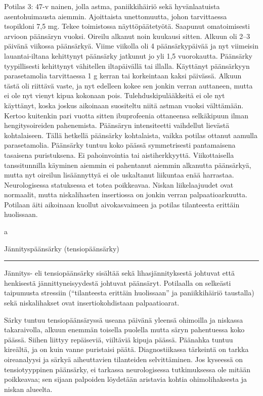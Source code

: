 \documentclass[
]{book}
\begin{document}
Potilas 3: 47-v nainen, jolla astma, paniikkihäiriö sekä hyvänlaatuista asentohuimausta aiemmin. Ajoittaista unettomuutta, johon tarvittaessa tsopikloni 7,5 mg. Tekee toimistossa näyttöpäätetyötä. Saapunut omatoimisesti arvioon päänsäryn vuoksi. Oireilu alkanut noin kuukausi sitten. Alkuun oli 2--3 päivänä viikossa päänsärkyä. Viime viikolla oli 4 päänsärkypäivää ja nyt viimeisin lauantai-iltana kehittynyt päänsärky jatkunut jo yli 1,5 vuorokautta. Päänsärky tyypillisesti kehittynyt vähitellen iltapäivällä tai illalla. Käyttänyt päänsärkyyn parasetamolia tarvittaessa 1 g kerran tai korkeintaan kaksi päivässä. Alkuun tästä oli riittävä vaste, ja nyt edelleen kokee sen jonkin verran auttaneen, mutta ei ole nyt vienyt kipua kokonaan pois. Tulehduskipulääkkeitä ei ole nyt käyttänyt, koska joskus aikoinaan suositeltu niitä astman vuoksi välttämään. Kertoo kuitenkin pari vuotta sitten ibuprofeenia ottaneensa selkäkipuun ilman hengitysoireiden pahenemista. Päänsäryn intensiteetti vaihdellut lievästä kohtalaiseen. Tällä hetkellä päänsärky kohtalaista, vaikka potilas ottanut aamulla parasetamolia. Päänsärky tuntuu koko päässä symmetrisesti pantamaisena tasaisena puristuksena. Ei pahoinvointia tai aistiherkkyyttä. Viikottaisella tanssitunnilla käyminen aiemmin ei pahentanut aiemmin alkanutta päänsärkyä, mutta nyt oireilun lisäännyttyä ei ole uskaltanut liikuntaa enää harrastaa. Neurologisessa statuksessa et totea poikkeavaa. Niskan liikelaajuudet ovat normaalit, mutta niskalihasten insertiossa on jonkin verran palpaatioarkuutta. Potilaan äiti aikoinaan kuollut aivokasvaimeen ja potilas tilanteesta erittäin huolissaan.

a

Jännityspäänsärky (tensiopäänsärky)

\begin{center}\rule{0.5\linewidth}{0.5pt}\end{center}

Jännitys- eli tensiopäänsärky sisältää sekä lihasjännityksestä johtuvat että henkisestä jännittyneisyydestä johtuvat päänsäryt. Potilaalla on selkeästi taipumusta stressiin (``tilanteesta erittäin huolissaan'' ja paniikkihäiriö taustalla) sekä niskalihakset ovat insertiokohdistaan palpaatioarat.

Särky tuntuu tensiopäänsäryssä useana päivänä yleensä ohimoilla ja niskassa takaraivolla, alkuun enemmän toisella puolella mutta säryn pahentuessa koko päässä. Siihen liittyy repäiseviä, viiltäviä kipuja päässä. Päänahka tuntuu kireältä, ja on kuin vanne puristaisi päätä. Diagnostiikassa tärkeintä on tarkka oireanalyysi ja särkyä aiheuttavien tilanteiden selvittäminen. Jos kyseessä on tensiotyyppinen päänsärky, ei tarkassa neurologisessa tutkimuksessa ole mitään poikkeavaa; sen sijaan palpoiden löydetään aristavia kohtia ohimolihaksesta ja niskan alueelta.
\end{document}
